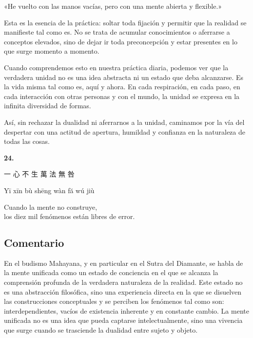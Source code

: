 \documentclass[
  a5paperpaper,
]{article}
\begin{document}
«He vuelto con las manos vacías, pero con una mente abierta y flexible.»

Esta es la esencia de la práctica: soltar toda fijación y permitir que
la realidad se manifieste tal como es. No se trata de acumular
conocimientos o aferrarse a conceptos elevados, sino de dejar ir toda
preconcepción y estar presentes en lo que surge momento a momento.

Cuando comprendemos esto en nuestra práctica diaria, podemos ver que la
verdadera unidad no es una idea abstracta ni un estado que deba
alcanzarse. Es la vida misma tal como es, aquí y ahora. En cada
respiración, en cada paso, en cada interacción con otras personas y con
el mundo, la unidad se expresa en la infinita diversidad de formas.

Así, sin rechazar la dualidad ni aferrarnos a la unidad, caminamos por
la vía del despertar con una actitud de apertura, humildad y confianza
en la naturaleza de todas las cosas.

\hfill\break

\hypertarget{04}{}
\begin{verseblock}

\newpage

\begin{center}\textbf{24.}\end{center}

一 心 不 生 萬 法 無 咎

Yī xīn bù shēng wàn fă wú jiù

Cuando la mente no construye,\\
los diez mil fenómenos están libres de error.

\end{verseblock}

\hfill\break

\hypertarget{comentario-23}{%
\subsection{Comentario}\label{comentario-23}}

En el budismo Mahayana, y en particular en el Sutra del Diamante, se
habla de la mente unificada como un estado de conciencia en el que se
alcanza la comprensión profunda de la verdadera naturaleza de la
realidad. Este estado no es una abstracción filosófica, sino una
experiencia directa en la que se disuelven las construcciones
conceptuales y se perciben los fenómenos tal como son:
interdependientes, vacíos de existencia inherente y en constante cambio.
La mente unificada no es una idea que pueda captarse intelectualmente,
sino una vivencia que surge cuando se trasciende la dualidad entre
sujeto y objeto.
\end{document}
